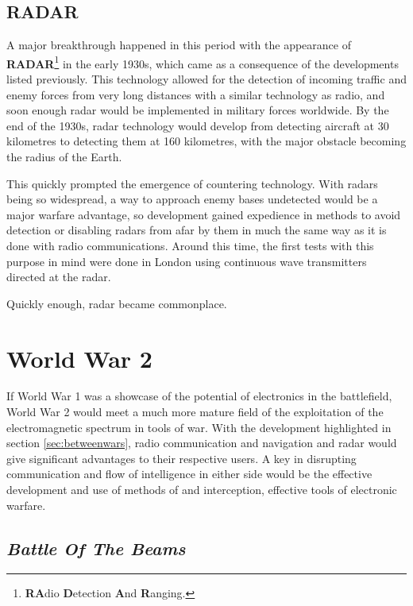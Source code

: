 \documentclass[palatino,english,purist]{ist-report}
\begin{document}
\subsection{RADAR}

A major breakthrough happened in this period with the appearance of \textbf{RADAR}\footnote{\textbf{RA}dio \textbf{D}etection \textbf{A}nd \textbf{R}anging.} in the early 1930s, which came as a consequence of the developments listed previously. This technology allowed for the detection of incoming traffic and enemy forces from very long distances with a similar technology as radio, and soon enough radar would be implemented in military forces worldwide. By the end of the 1930s, radar technology would develop from detecting aircraft at 30 kilometres to detecting them at 160 kilometres, with the major obstacle becoming the radius of the Earth.

This quickly prompted the emergence of countering technology. With radars being so widespread, a way to approach enemy bases undetected would be a major warfare advantage, so development gained expedience in methods to avoid detection or disabling radars from afar by \jamming{} them in much the same way as it is done with radio communications. Around this time, the first tests with this purpose in mind were done in London using continuous wave transmitters directed at the radar.

Quickly enough, radar \jamming{} became commonplace.

\section{World War 2}

If World War 1 was a showcase of the potential of electronics in the battlefield, World War 2 would meet a much more mature field of the exploitation of the electromagnetic spectrum in tools of war. With the development highlighted in section \ref{sec:betweenwars}, radio communication and navigation and radar would give significant advantages to their respective users. A key in disrupting communication and flow of intelligence in either side would be the effective development and use of methods of \jamming{} and interception, effective tools of electronic warfare.

\subsection{\textit{Battle Of The Beams}}
\end{document}
